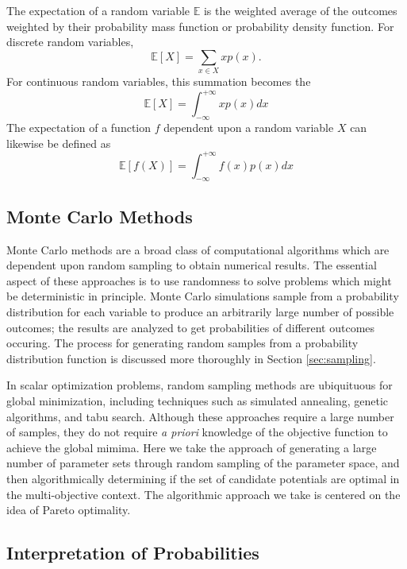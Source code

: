  The expectation of a random variable $\mathbb{E}$ is the weighted average of the outcomes weighted by their probability mass function or probability density function.  For discrete random variables,
 \begin{equation}
	 \mathbb{E}[X] = \sum_{x\in X} x p(x).
	\end{equation}
For continuous random variables, this summation becomes the
\begin{equation}
	\mathbb{E}[X] = \int_{-\infty}^{+\infty} x p(x) dx
\end{equation}
The expectation of a function $f$ dependent upon a random variable $X$ can likewise be defined as
\begin{equation}
	\mathbb{E}[f(X)] = \int_{-\infty}^{+\infty} f(x) p(x) dx
\end{equation}
\subsection{Monte Carlo Methods}
Monte Carlo methods\cite{thomopoulos2013_montecarlo} are a broad class of computational algorithms which are dependent upon random sampling to obtain numerical results.
The essential aspect of these approaches is to use randomness to solve problems which might be deterministic in principle.
Monte Carlo simulations sample from a probability distribution for each variable to produce an arbitrarily large number of possible outcomes; the results are analyzed to get probabilities of different outcomes occuring.  The process for generating random samples from a probability distribution function is discussed more thoroughly in Section \ref{sec:sampling}.

In scalar optimization problems, random sampling methods are ubiquituous for global minimization, including techniques such as simulated annealing\cite{kirkpatrick1983_simmulated_annealing}, genetic algorithms\cite{holland1975_ga}, and tabu search\cite{glover1986_tabu}.  Although these approaches require a large number of samples, they do not require \emph{a priori} knowledge of the objective function to achieve the global mimima.
Here we take the approach of generating a large number of parameter sets through random sampling of the parameter space, and then algorithmically determining if the set of candidate potentials are optimal in the multi-objective context.  The algorithmic approach we take is centered on the idea of Pareto optimality.

\subsection{Interpretation of Probabilities}

